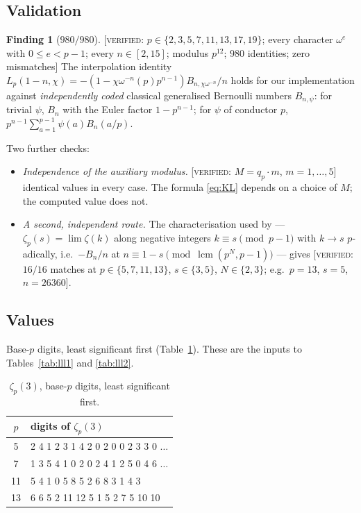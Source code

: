 \documentclass[11pt,reqno]{article}
\DeclareMathOperator{\lcm}{lcm}
\newcommand{\VER}[1]{{\normalfont\textsc{[verified:} #1\textsc{]}}}
\theoremstyle{plain}
\theoremstyle{definition}
\newtheorem{finding}[theorem]{Finding}
\theoremstyle{remark}
\numberwithin{equation}{section}
\begin{document}
\subsection{Validation}\label{app:KLvalid}

\begin{finding}[$980/980$]\label{find:980}
\VER{$p\in\{2,3,5,7,11,13,17,19\}$; every character $\omega^e$ with
$0\le e<p-1$; every $n\in[2,15]$; modulus $p^{12}$; $980$ identities; zero
mismatches}  The interpolation identity
$L_p(1-n,\chi)=-(1-\chi\omega^{-n}(p)p^{n-1})B_{n,\chi\omega^{-n}}/n$ holds for
our implementation against \emph{independently coded} classical generalised
Bernoulli numbers $B_{n,\psi}$: for trivial $\psi$, $B_n$ with the Euler factor
$1-p^{n-1}$; for $\psi$ of conductor $p$,
$p^{n-1}\sum_{a=1}^{p-1}\psi(a)B_n(a/p)$.
\end{finding}

Two further checks:

\begin{itemize}[leftmargin=1.5em]
\item \emph{Independence of the auxiliary modulus.}  \VER{$M=q_p\cdot m$,
  $m=1,\dots,5$} identical values in every case.  The formula \eqref{eq:KL}
  depends on a choice of $M$; the computed value does not.
\item \emph{A second, independent route.}  The characterisation used by
  \cite{LSZ2025,BV2025} --- $\zeta_p(s)=\lim\zeta(k)$ along negative integers
  $k\equiv s\pmod{p-1}$ with $k\to s$ $p$-adically, i.e.\ $-B_n/n$ at
  $n\equiv1-s\pmod{\lcm(p^N,p-1)}$ --- gives \VER{$16/16$ matches at
  $p\in\{5,7,11,13\}$, $s\in\{3,5\}$, $N\in\{2,3\}$; e.g.\ $p=13$, $s=5$,
  $n=26360$}.
\end{itemize}

\subsection{Values}\label{app:KLvalues}

Base-$p$ digits, least significant first (Table~\ref{tab:zetadigits}).  These
are the inputs to Tables~\ref{tab:lll1} and \ref{tab:lll2}.

\begin{table}[h]
\centering\small
\caption{$\zeta_p(3)$, base-$p$ digits, least significant first.}
\label{tab:zetadigits}
\begin{tabular}{@{}cl@{}}
\toprule
$p$ & digits of $\zeta_p(3)$\\
\midrule
5 & 2 4 1 2 3 1 4 2 0 2 0 0 2 3 3 0 $\dots$\\
7 & 1 3 5 4 1 0 2 0 2 4 1 2 5 0 4 6 $\dots$\\
11 & 5 4 1 0 5 8 5 2 6 8 3 1 4 3\\
13 & 6 6 5 2 11 12 5 1 5 2 7 5 10 10\\
\bottomrule
\end{tabular}
\end{table}
\end{document}
